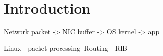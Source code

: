 
\chapter{Introduction}
Network packet -> NIC buffer -> OS kernel -> app

Linux - packet processing,
Routing - RIB
